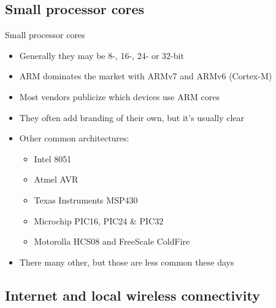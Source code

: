 \documentclass{beamer}
\begin{document}
\subsection{Small processor cores}

\begin{frame}{Small processor cores}
\begin{itemize}
  \item Generally they may be 8-, 16-, 24- or 32-bit
  \item ARM dominates the market with ARMv7 and ARMv6 (Cortex-M)
  \item Most vendors publicize which devices use ARM cores
  \item They often add branding of their own, but it's usually clear
  \item Other common architectures:
  \begin{itemize}
    \item Intel 8051
    \item Atmel AVR
    \item Texas Instruments MSP430
    \item Microchip PIC16, PIC24 \& PIC32
    \item Motorolla HCS08 and FreeScale ColdFire
  \end{itemize}
  \item There many other, but those are less common these days
\end{itemize}
\end{frame}

\subsection{Internet and local wireless connectivity}
\end{document}
